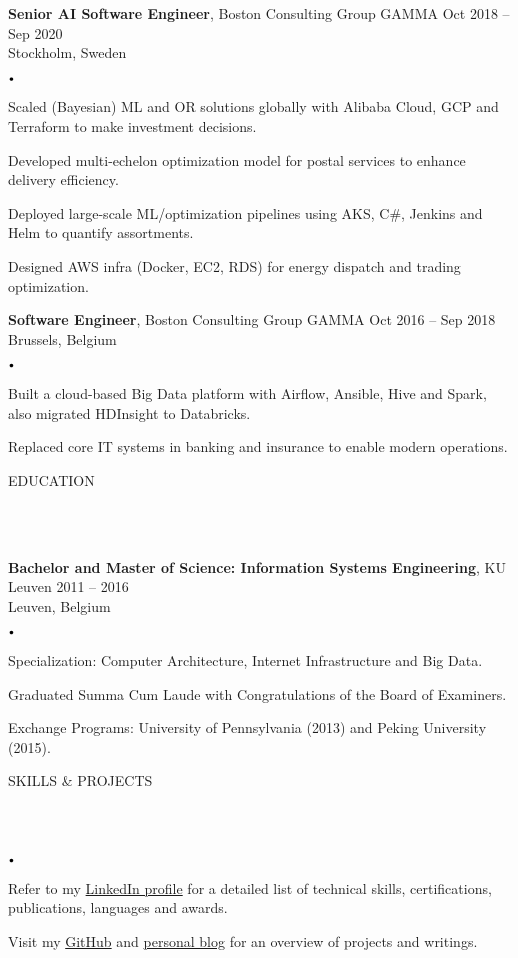 \documentclass{article}
\newcommand{\header}[1]{
    {
        \hspace*{-4pt}
        \vspace*{8pt}
        \uppercase{#1}
    }
    \vspace*{-4pt} 
    \lineunder
    \vspace*{8pt}
}
\newcommand{\lineunder}{
    \vspace*{-8pt} \\ 
    \hspace*{-4pt} 
    \hrulefill \\
}
\newcommand{\experience}[5]{
    \vspace*{2pt}
    \textbf{#1}, #2 \hfill #3 \\ 
    #4 \\
    #5
    \vspace*{2pt}
}
\newcommand{\spacedbullet}{
    $\vcenter{\hbox{\tiny$\bullet$}}$\hspace*{-2pt}
}
\newenvironment{bulletlist}{
    \begin{list}
        {\spacedbullet}{\setlength\leftmargin{10pt} 
        \topsep 0pt \itemsep -2pt}}{\vspace*{4pt}
    \end{list}
}
\begin{document}
\experience{Senior AI Software Engineer}{Boston Consulting Group GAMMA}{Oct 2018 -- Sep 2020}{Stockholm, Sweden}
{
    \begin{bulletlist}
        \item Scaled (Bayesian) ML and OR solutions globally with Alibaba Cloud, GCP and Terraform to make investment decisions.
        \item Developed multi-echelon optimization model for postal services to enhance delivery efficiency.
        \item Deployed large-scale ML/optimization pipelines using AKS, C\#, Jenkins and Helm to quantify assortments.
        \item Designed AWS infra (Docker, EC2, RDS) for energy dispatch and trading optimization.
    \end{bulletlist}
}

\experience{Software Engineer}{Boston Consulting Group GAMMA}{Oct 2016 -- Sep 2018}{Brussels, Belgium}
{
    \begin{bulletlist}
        \item Built a cloud-based Big Data platform with Airflow, Ansible, Hive and Spark, also migrated HDInsight to Databricks.
        \item Replaced core IT systems in banking and insurance to enable modern operations.
    \end{bulletlist}
}

\vspace*{4pt}

\header{Education}
\experience{Bachelor and Master of Science: Information Systems Engineering}{KU Leuven}{2011 -- 2016}{Leuven, Belgium}
{
    \begin{bulletlist}
        \item Specialization: Computer Architecture, Internet Infrastructure and Big Data.
        \item Graduated Summa Cum Laude with Congratulations of the Board of Examiners.
        \item Exchange Programs: University of Pennsylvania (2013) and Peking University (2015).
    \end{bulletlist}
}

\vspace*{4pt}
\header{Skills \& Projects}
\begin{bulletlist}
    \item Refer to my \href{https://linkedin.com/in/nielsdegrande/}{LinkedIn profile} for a detailed list of technical skills, certifications, publications, languages and awards.
    \item Visit my \href{https://github.com/NielsDegrande/}{GitHub} and \href{https://niels.degran.de/blog}{personal blog} for an overview of projects and writings.
\end{bulletlist}
\end{document}

